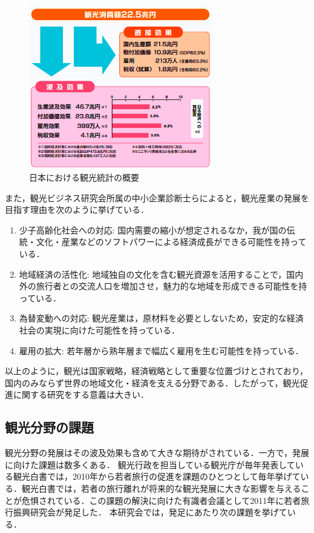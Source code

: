\documentclass{jsarticle}
\begin{document}
\begin{figure}[!ht]
\begin{center}
\includegraphics[width=8.0cm]{./image/tourism_kibo.png}
\caption{日本における観光統計の概要\cite{tourism_stat}}
\label{tourism_kibo}
\end{center}
\end{figure}

また，観光ビジネス研究会所属の中小企業診断士らによると，観光産業の発展を目指す理由を次のように挙げている\cite{tourism_future}．

\begin{enumerate}
\item 少子高齢化社会への対応: 国内需要の縮小が想定されるなか，我が国の伝統・文化・産業などのソフトパワーによる経済成長ができる可能性を持っている．
\item 地域経済の活性化: 地域独自の文化を含む観光資源を活用することで，国内外の旅行者との交流人口を増加させ，魅力的な地域を形成できる可能性を持っている．
\item 為替変動への対応: 観光産業は，原材料を必要としないため，安定的な経済社会の実現に向けた可能性を持っている．
\item 雇用の拡大: 若年層から熟年層まで幅広く雇用を生む可能性を持っている．
\end{enumerate}


以上のように，観光は国家戦略，経済戦略として重要な位置づけとされており，国内のみならず世界の地域文化・経済を支える分野である．したがって，観光促進に関する研究をする意義は大きい．

\subsection{観光分野の課題}

観光分野の発展はその波及効果も含めて大きな期待がされている．一方で，発展に向けた課題は数多くある．
観光行政を担当している観光庁が毎年発表している観光白書では，2010年から若者旅行の促進を課題のひとつとして毎年挙げている\cite{kanko_hakusho_2009}\cite{kanko_hakusho_2010}\cite{kanko_hakusho_2011}\cite{kanko_hakusho_2012}\cite{kanko_hakusho_2013}\cite{kanko_hakusho_2014}．観光白書では，若者の旅行離れが将来的な観光発展に大きな影響を与えることが危惧されている．この課題の解決に向けた有識者会議として2011年に若者旅行振興研究会が発足した．
本研究会では，発足にあたり次の課題を挙げている\cite{wakamono_shinko}．
\end{document}
